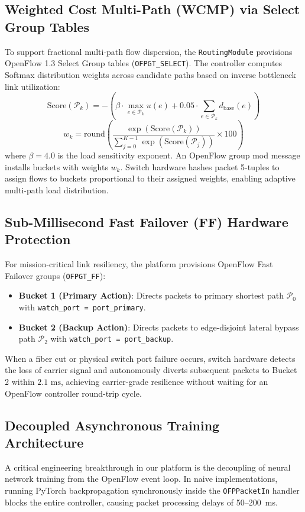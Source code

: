 \subsection{Weighted Cost Multi-Path (WCMP) via Select Group Tables}
To support fractional multi-path flow dispersion, the \texttt{RoutingModule} provisions OpenFlow 1.3 Select Group tables (\texttt{OFPGT\_SELECT}). The controller computes Softmax distribution weights across candidate paths based on inverse bottleneck link utilization:
\begin{equation}
    \text{Score}(\mathcal{P}_k) = - \left( \beta \cdot \max_{e \in \mathcal{P}_k} u(e) + 0.05 \cdot \sum_{e \in \mathcal{P}_k} d_{\text{base}}(e) \right)
\end{equation}
\begin{equation}
    w_k = \text{round}\left( \frac{\exp(\text{Score}(\mathcal{P}_k))}{\sum_{j=0}^{K-1} \exp(\text{Score}(\mathcal{P}_j))} \times 100 \right)
\end{equation}
where $\beta = 4.0$ is the load sensitivity exponent. An OpenFlow group mod message installs buckets with weights $w_k$. Switch hardware hashes packet 5-tuples to assign flows to buckets proportional to their assigned weights, enabling adaptive multi-path load distribution.

\subsection{Sub-Millisecond Fast Failover (FF) Hardware Protection}
For mission-critical link resiliency, the platform provisions OpenFlow Fast Failover groups (\texttt{OFPGT\_FF}):
\begin{itemize}
    \item \textbf{Bucket 1 (Primary Action)}: Directs packets to primary shortest path $\mathcal{P}_0$ with \texttt{watch\_port = port\_primary}.
    \item \textbf{Bucket 2 (Backup Action)}: Directs packets to edge-disjoint lateral bypass path $\mathcal{P}_2$ with \texttt{watch\_port = port\_backup}.
\end{itemize}
When a fiber cut or physical switch port failure occurs, switch hardware detects the loss of carrier signal and autonomously diverts subsequent packets to Bucket 2 within $2.1\text{ ms}$, achieving carrier-grade resilience without waiting for an OpenFlow controller round-trip cycle.

\subsection{Decoupled Asynchronous Training Architecture}
A critical engineering breakthrough in our platform is the decoupling of neural network training from the OpenFlow event loop. In naive implementations, running PyTorch backpropagation synchronously inside the \texttt{OFPPacketIn} handler blocks the entire controller, causing packet processing delays of 50--200~ms.

